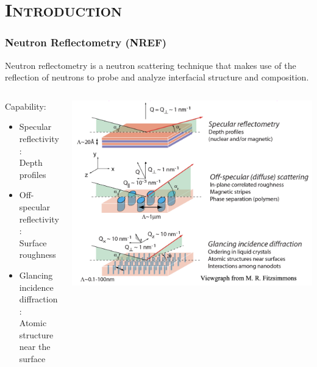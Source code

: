 \documentclass[xcolor=x11names, compress, handout]{beamer}
\renewcommand{\(}{\begin{columns}}
\renewcommand{\)}{\end{columns}}
\newcommand{\<}[1]{\begin{column}{#1}}
\renewcommand{\>}{\end{column}}
\begin{document}
\section{\scshape Introduction}
\begin{frame}
  \frametitle{Neutron Reflectometry (NREF)}
  Neutron reflectometry is a neutron scattering technique that makes use of the reflection of neutrons to probe and analyze interfacial structure and composition. \\

  \begin{columns}
  \begin{column}{0.5\textwidth}
  Capability:
  \begin{itemize}
  \item{Specular reflectivity:} \\
        Depth profiles
  \item{Off-specular reflectivity:} \\
        Surface roughness
  \item{Glancing incidence diffraction:} \\
        Atomic structure near the surface
  \end{itemize}
  \end{column}
  \begin{column}{0.5\textwidth}  %
  \begin{center}
  \includegraphics[width=\textwidth]{images/NREF_types.png}

  \end{center}
  \end{column}
  \end{columns}

\end{frame}
\end{document}
